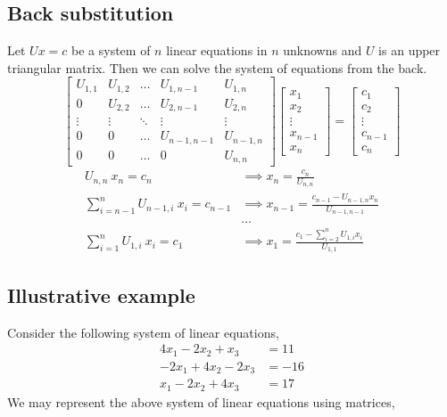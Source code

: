 \subsection{Back substitution}
	Let $Ux = c$ be a system of $n$ linear equations in $n$ unknowns and $U$ is an upper triangular matrix.
	Then we can solve the system of equations from the back.
	\[ \begin{bmatrix} U_{1,1} & U_{1,2} & \dots & U_{1,n-1} & U_{1,n} \\ 0 & U_{2,2} & \dots & U_{2,n-1} & U_{2,n} \\ \vdots & \vdots & \ddots & \vdots & \vdots \\ 0 & 0 & \dots & U_{n-1,n-1} & U_{n-1,n} \\ 0 & 0 & \dots & 0 & U_{n,n} \end{bmatrix} \begin{bmatrix} x_1 \\ x_2 \\ \vdots \\ x_{n-1} \\ x_n \end{bmatrix} = \begin{bmatrix} c_1 \\ c_2 \\ \vdots \\ c_{n-1} \\ c_n \end{bmatrix} \]
	\begin{align*}
		U_{n,n}\ x_n = c_n & \implies x_n = \frac{c_n}{U_{n,n}} \\
		\sum_{i=n-1}^{n} U_{n-1,i}\ x_i = c_{n-1}  & \implies x_{n-1} = \frac{c_{n-1} - U_{n-1,n} x_n}{U_{n-1,n-1}} \\
		& \dots \\
		\sum_{i=1}^n U_{1,i}\ x_i  = c_1 & \implies x_1 = \frac{c_1 - \sum_{i = 2}^{n} U_{1,i} x_i}{U_{1,1}}
	\end{align*}

\subsection{Illustrative example}
	Consider the following system of linear equations,
	\begin{align*}
		4x_1  - 2x_2  + x_3 & = 11 \\
		-2x_1  + 4x_2 - 2x_3 & = -16 \\
		x_1  - 2x_2 + 4x_3 & = 17 
	\end{align*} 
	We may represent the above system of linear equations using matrices,

